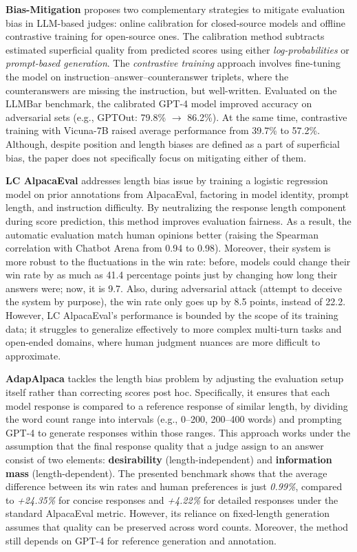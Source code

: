 \documentclass[sigconf, authoryear]{acmart}
\begin{document}
\textbf{Bias-Mitigation} proposes two complementary strategies to mitigate evaluation bias in LLM-based judges: online calibration for closed-source models and offline contrastive training for open-source ones.
The calibration method subtracts estimated superficial quality from predicted scores using either \textit{log-probabilities} or \textit{prompt-based generation}.
The \textit{contrastive training} approach involves fine-tuning the model on instruction–answer–counteranswer triplets, where the counteranswers are missing the instruction, but well-written.
Evaluated on the LLMBar benchmark, the calibrated GPT-4 model improved accuracy on adversarial sets (e.g., GPTOut: 79.8\% $\rightarrow$ 86.2\%).
At the same time, contrastive training with Vicuna-7B raised average performance from 39.7\% to 57.2\%.
Although, despite position and length biases are defined as a part of superficial bias, the paper does not specifically focus on mitigating either of them\cite{zhou2024mitigatingbiaslargelanguage}.

\textbf{LC AlpacaEval} addresses length bias issue by training a logistic regression model on prior annotations from AlpacaEval, factoring in model identity, prompt length, and instruction difficulty.
By neutralizing the response length component during score prediction, this method improves evaluation fairness.
As a result, the automatic evaluation match human opinions better (raising the Spearman correlation with Chatbot Arena from 0.94 to 0.98).
Moreover, their system is more robust to the fluctuations in the win rate: before, models could change their win rate by as much as 41.4 percentage points just by changing how long their answers were; now, it is 9.7.
Also, during adversarial attack (attempt to deceive the system by purpose), the win rate only goes up by 8.5 points, instead of 22.2.
However, LC AlpacaEval's performance is bounded by the scope of its training data; it struggles to generalize effectively to more complex multi-turn tasks and open-ended domains, where human judgment nuances are more difficult to approximate\cite{lc_alpacha}.

\textbf{AdapAlpaca} tackles the length bias problem by adjusting the evaluation setup itself rather than correcting scores post hoc.
Specifically, it ensures that each model response is compared to a reference response of similar length, by dividing the word count range into intervals (e.g., 0–200, 200–400 words) and prompting GPT-4 to generate responses within those ranges.
This approach works under the assumption that the final response quality that a judge assign to an answer consist of two elements: \textbf{desirability} (length-independent) and \textbf{information mass} (length-dependent).
The presented benchmark shows that the average difference between its win rates and human preferences is just \textit{0.99\%}, compared to \textit{+24.35\%} for concise responses and \textit{+4.22\%} for detailed responses under the standard AlpacaEval metric.
However, its reliance on fixed-length generation assumes that quality can be preserved across word counts.
Moreover, the method still depends on GPT-4 for reference generation and annotation\cite{hu2024explaininglengthbiasllmbased}.
\end{document}
